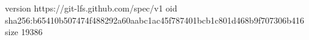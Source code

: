 version https://git-lfs.github.com/spec/v1
oid sha256:b65410b507474f488292a60aabc1ac45f787401bcb1c801d468b9f707306b416
size 19386
